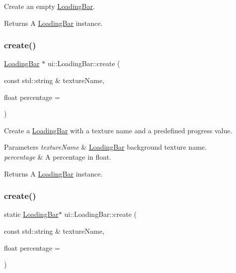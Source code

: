Create an empty \hyperlink{classui_1_1LoadingBar}{Loading\+Bar}. \begin{DoxyReturn}{Returns}
A \hyperlink{classui_1_1LoadingBar}{Loading\+Bar} instance. 
\end{DoxyReturn}
\mbox{\label{classui_1_1LoadingBar_af2148a31173a31b52ee5f4d756a14ae0}} 
\subsubsection{\texorpdfstring{create()}{create()}\hspace{0.1cm}{\footnotesize\ttfamily [3/6]}}
{\footnotesize\ttfamily \hyperlink{classui_1_1LoadingBar}{Loading\+Bar} $\ast$ ui\+::\+Loading\+Bar\+::create (\begin{DoxyParamCaption}\item[{const std\+::string \&}]{texture\+Name,  }\item[{float}]{percentage = {} }\end{DoxyParamCaption})\hspace{0.3cm}{\ttfamily [static]}}



Create a \hyperlink{classui_1_1LoadingBar}{Loading\+Bar} with a texture name and a predefined progress value. 


\begin{DoxyParams}{Parameters}
{\em texture\+Name} & \hyperlink{classui_1_1LoadingBar}{Loading\+Bar} background texture name. \\
\hline
{\em percentage} & A percentage in float. \\
\hline
\end{DoxyParams}
\begin{DoxyReturn}{Returns}
A \hyperlink{classui_1_1LoadingBar}{Loading\+Bar} instance. 
\end{DoxyReturn}
\mbox{\label{classui_1_1LoadingBar_a5efe082b456c8a5c5c2dc264e7c96479}} 
\subsubsection{\texorpdfstring{create()}{create()}\hspace{0.1cm}{\footnotesize\ttfamily [4/6]}}
{\footnotesize\ttfamily static \hyperlink{classui_1_1LoadingBar}{Loading\+Bar}$\ast$ ui\+::\+Loading\+Bar\+::create (\begin{DoxyParamCaption}\item[{const std\+::string \&}]{texture\+Name,  }\item[{float}]{percentage = {} }\end{DoxyParamCaption})\hspace{0.3cm}{\ttfamily [static]}}



